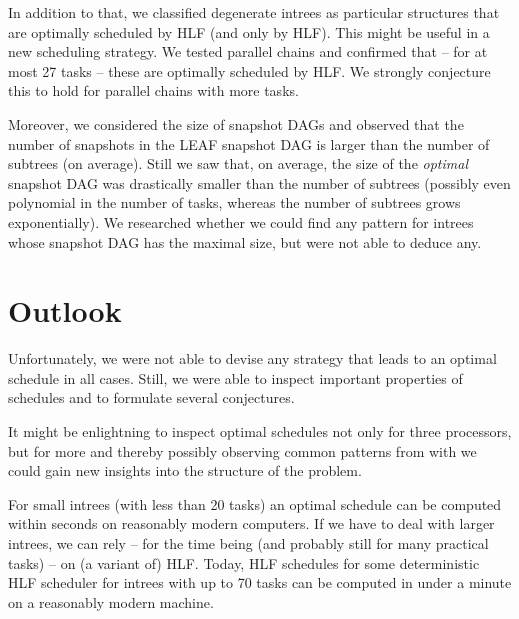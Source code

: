In addition to that, we classified degenerate intrees as particular structures that are optimally scheduled by HLF (and only by HLF). This might be useful in a new scheduling strategy. We tested parallel chains and confirmed that -- for at most 27 tasks -- these are optimally scheduled by HLF. We strongly conjecture this to hold for parallel chains with more tasks.

Moreover, we considered the size of snapshot DAGs and observed that the number of snapshots in the LEAF snapshot DAG is larger than the number of subtrees (on average). Still we saw that, on average, the size of the \emph{optimal} snapshot DAG was drastically smaller than the number of subtrees (possibly even polynomial in the number of tasks, whereas the number of subtrees grows exponentially). We researched whether we could find any pattern for intrees whose snapshot DAG has the maximal size, but were not able to deduce any.

\section{Outlook}
\label{sec:conclusion-outlook}

Unfortunately, we were not able to devise any strategy that leads to an optimal schedule in all cases. Still, we were able to inspect important properties of schedules and to formulate several conjectures.

It might be enlightning to inspect optimal schedules not only for three processors, but for more and thereby possibly observing common patterns from with we could gain new insights into the structure of the problem.

For small intrees (with less than 20 tasks) an optimal schedule can be computed within seconds on reasonably modern computers. If we have to deal with larger intrees, we can rely -- for the time being (and probably still for many practical tasks) -- on (a variant of) HLF. Today, HLF schedules for some deterministic HLF scheduler for intrees with up to 70 tasks can be computed in under a minute on a reasonably modern machine.

